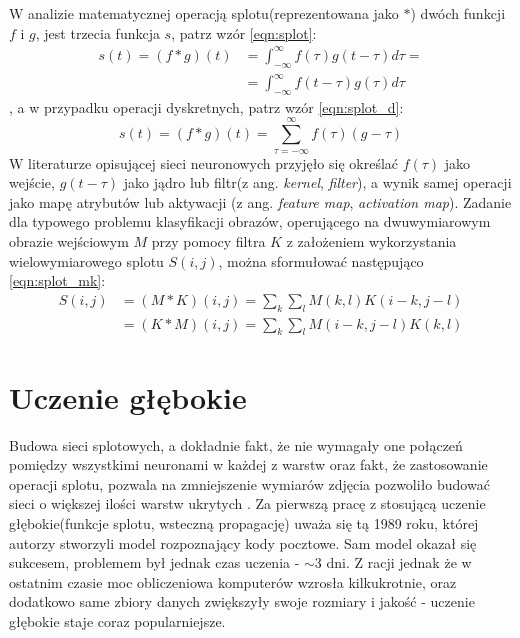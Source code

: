 W analizie matematycznej operacją splotu(reprezentowana jako $*$) dwóch funkcji $f$ i $g$, jest trzecia funkcja $s$, patrz wzór \ref{eqn:splot}:
\begin{equation}
	\begin{split}
		s(t) = (f * g)(t) & = \int_{-\infty}^{\infty}f(\tau)g(t-\tau)d\tau =\\
						  & =\int_{-\infty}^{\infty}f(t-\tau)g(\tau)d\tau
	\end{split}
	\label{eqn:splot}
\end{equation}
, a w przypadku operacji dyskretnych, patrz wzór \ref{eqn:splot_d}:
\begin{equation}
	s(t)=(f*g)(t)=\sum_{\tau = -\infty}^{\infty}f(\tau)(g-\tau)
	\label{eqn:splot_d}
\end{equation}
W literaturze opisującej sieci neuronowych przyjęło się określać $f(\tau)$ jako wejście, $g(t - \tau)$ jako jądro lub filtr(z ang. \textit{kernel}, \textit{filter}), a wynik samej operacji jako mapę atrybutów lub aktywacji (z ang. \textit{feature map}, \textit{activation map})\cite{piczak}. Zadanie dla typowego problemu klasyfikacji obrazów, operującego na dwuwymiarowym obrazie wejściowym $M$ przy pomocy filtra $K$ z założeniem wykorzystania wielowymiarowego splotu $S(i, j)$, można sformułować następująco \ref{eqn:splot_mk}:
\begin{equation}
	\begin{split}
	S(i, j) & = (M*K)(i,j)=\sum_{k}^{}\sum_{l}^{}M(k,l)K(i-k,j-l) \\
		    & = (K*M)(i,j)=\sum_{k}^{}\sum_{l}^{}M(i-k,j-l)K(k,l)
	\end{split}
	\label{eqn:splot_mk}
\end{equation}

\section{Uczenie głębokie}

Budowa sieci splotowych, a dokładnie fakt, że nie wymagały one połączeń pomiędzy wszystkimi neuronami w każdej z warstw oraz fakt, że zastosowanie operacji splotu, pozwala na zmniejszenie wymiarów zdjęcia pozwoliło budować sieci o większej ilości warstw ukrytych \cite{python_ml}. Za pierwszą pracę z stosującą uczenie głębokie(funkcje splotu, wsteczną propagację) uważa się tą 1989 roku, której autorzy stworzyli model rozpoznający kody pocztowe\cite{lecun}. Sam model okazał się sukcesem, problemem był jednak czas uczenia - $\sim$3 dni. Z racji jednak że w ostatnim czasie moc obliczeniowa komputerów wzrosła kilkukrotnie, oraz dodatkowo same zbiory danych zwiększyły swoje rozmiary i jakość - uczenie głębokie staje coraz popularniejsze\cite{hands_on}.

























